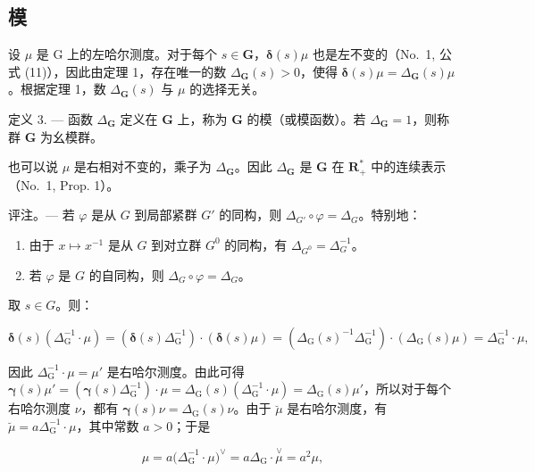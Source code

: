 \subsection{模}

设 \(\mu\) 是 G 上的左哈尔测度。对于每个 \(s \in \mathbf{G}\)，\(\pmb{\delta}(s)\mu\) 也是左不变的（No.~1, 公式 (11)），因此由定理 1，存在唯一的数 \(\Delta_{\mathbf{G}}(s) > 0\)，使得 \(\pmb{\delta}(s)\mu = \Delta_{\mathbf{G}}(s)\mu\)。根据定理 1，数 \(\Delta_{\mathbf{G}}(s)\) 与 \(\mu\) 的选择无关。

定义 3. --- 函数 \(\Delta_{\mathbf{G}}\) 定义在 \(\mathbf{G}\) 上，称为 \(\mathbf{G}\) 的模（或模函数）。若 \(\Delta_{\mathbf{G}} = 1\)，则称群 \(\mathbf{G}\) 为幺模群。

也可以说 \(\mu\) 是右相对不变的，乘子为 \(\Delta_{\mathbf{G}}\)。因此 \(\Delta_{\mathbf{G}}\) 是 \(\mathbf{G}\) 在 \(\mathbf{R}_{+}^{*}\) 中的连续表示（No.~1, Prop. 1）。

评注。--- 若 \(\varphi\) 是从 \(G\) 到局部紧群 \(G'\) 的同构，则 \(\Delta_{G'} \circ \varphi = \Delta_G\)。特别地：

\begin{enumerate}
\def\labelenumi{\arabic{enumi})}
\item
  由于 \(x \mapsto x^{-1}\) 是从 \(G\) 到对立群 \(G^0\) 的同构，有 \(\Delta_{G^0} = \Delta_{G}^{-1}\)。
\item
  若 \(\varphi\) 是 \(G\) 的自同构，则 \(\Delta_G \circ \varphi = \Delta_G\)。
\end{enumerate}

取 \(s \in G\)。则：

\[
\boldsymbol {\delta} (s) \left(\Delta_ {\mathrm{G}} ^ {- 1} \cdot \mu\right) = \left(\boldsymbol {\delta} (s) \Delta_ {\mathrm{G}} ^ {- 1}\right) \cdot \left(\boldsymbol {\delta} (s) \mu\right) = \left(\Delta_ {\mathrm{G}} (s) ^ {- 1} \Delta_ {\mathrm{G}} ^ {- 1}\right) \cdot \left(\Delta_ {\mathrm{G}} (s) \mu\right) = \Delta_ {\mathrm{G}} ^ {- 1} \cdot \mu ,
\]

因此 \(\Delta_{\mathrm{G}}^{-1} \cdot \mu = \mu'\) 是右哈尔测度。由此可得 \(\boldsymbol{\gamma}(s)\mu' = (\boldsymbol{\gamma}(s)\Delta_{\mathrm{G}}^{-1}) \cdot \mu = \Delta_{\mathrm{G}}(s)(\Delta_{\mathrm{G}}^{-1} \cdot \mu) = \Delta_{\mathrm{G}}(s)\mu'\)，所以对于每个右哈尔测度 \(\nu\)，都有 \(\boldsymbol{\gamma}(s)\nu = \Delta_{\mathrm{G}}(s)\nu\)。由于 \(\breve{\mu}\) 是右哈尔测度，有 \(\breve{\mu} = a\Delta_{\mathrm{G}}^{-1} \cdot \mu\)，其中常数 \(a > 0\)；于是

\[
\mu = a \big (\Delta_ {\mathrm{G}} ^ {- 1} \cdot \mu \big) ^ {\vee} = a \Delta_ {\mathrm{G}} \cdot \stackrel {\vee} {\mu} = a ^ {2} \mu ,
\]

